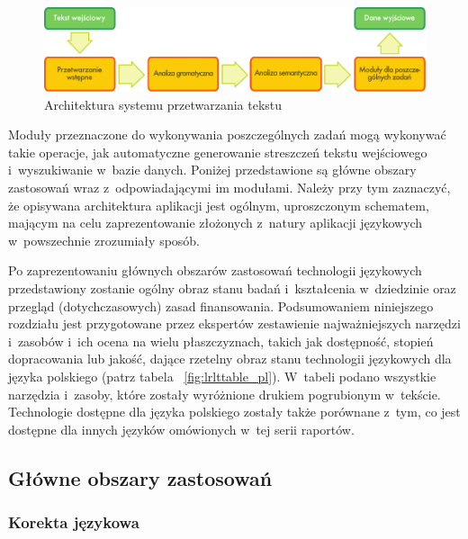 \begin{multicols}{2}
\begin{figure}[b]  \center
\includegraphics[width=\textwidth]{../_media/polish/text_processing_app_architecture}
\caption{Architektura systemu przetwarzania tekstu} \label{fig:textprocessingarch_pl} 
\end{figure} 

Moduły przeznaczone do wykonywania poszczególnych zadań mogą
wykonywać takie operacje, jak automatyczne generowanie streszczeń
tekstu wejściowego i~wyszukiwanie w~bazie danych. Poniżej
przedstawione są główne obszary zastosowań wraz z~odpowiadającymi
im modułami. Należy przy tym zaznaczyć, że opisywana architektura
aplikacji jest ogólnym, uproszczonym schematem, mającym na celu
zaprezentowanie złożonych z~natury aplikacji językowych
w~powszechnie zrozumiały sposób. 

Po zaprezentowaniu głównych obszarów zastosowań technologii
językowych przedstawiony zostanie ogólny obraz stanu badań
i~kształcenia w~dziedzinie oraz przegląd (dotychczasowych) zasad
finansowania. Podsumowaniem niniejszego rozdziału jest przygotowane
przez ekspertów zestawienie najważniejszych narzędzi i~zasobów
i~ich ocena na wielu płaszczyznach, takich jak dostępność,
stopień dopracowania lub jakość, dające rzetelny obraz stanu
technologii językowych dla języka polskiego (patrz tabela ~\ref{fig:lrlttable_pl}). W~tabeli podano wszystkie narzędzia i~zasoby, które
zostały wyróżnione drukiem pogrubionym w~tekście. Technologie
dostępne dla języka polskiego zostały także porównane z~tym, co
jest dostępne dla innych języków omówionych w~tej serii raportów. 

\vfill

\subsection[Główne obszary zastosowań]{Główne obszary
zastosowań} 

\subsubsection[Korekta językowa]{Korekta językowa} 


\end{multicols}
